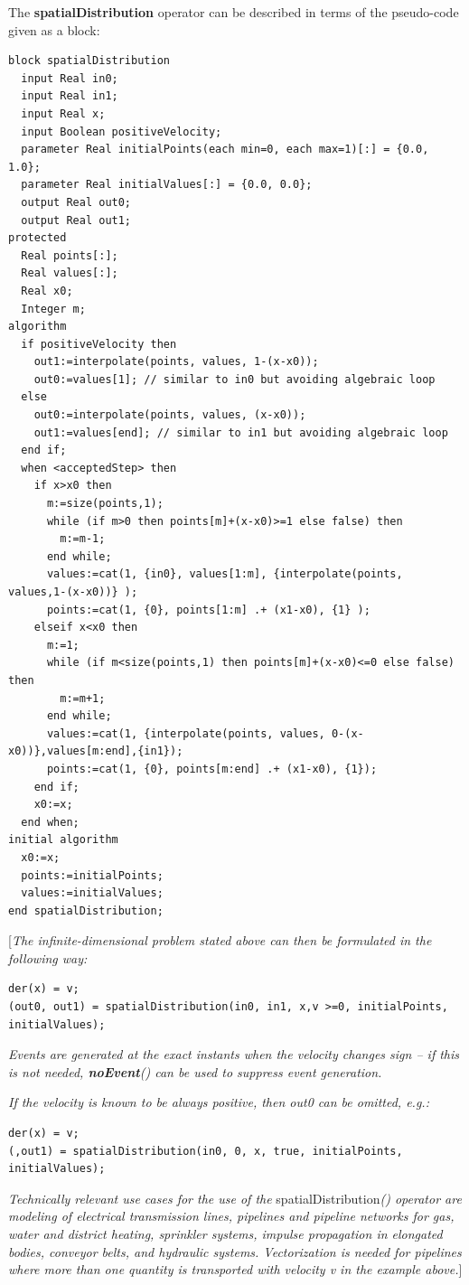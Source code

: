 \documentclass[10pt,a4paper]{report}
\begin{document}
The \textbf{spatialDistribution} operator can be described in terms of
the pseudo-code given as a block:
\begin{lstlisting}[language=modelica]
block spatialDistribution
  input Real in0;
  input Real in1;
  input Real x;
  input Boolean positiveVelocity;
  parameter Real initialPoints(each min=0, each max=1)[:] = {0.0, 1.0};
  parameter Real initialValues[:] = {0.0, 0.0};
  output Real out0;
  output Real out1;
protected
  Real points[:];
  Real values[:];
  Real x0;
  Integer m;
algorithm
  if positiveVelocity then
    out1:=interpolate(points, values, 1-(x-x0));
    out0:=values[1]; // similar to in0 but avoiding algebraic loop
  else
    out0:=interpolate(points, values, (x-x0));
    out1:=values[end]; // similar to in1 but avoiding algebraic loop
  end if;
  when <acceptedStep> then
    if x>x0 then
      m:=size(points,1);
      while (if m>0 then points[m]+(x-x0)>=1 else false) then
        m:=m-1;
      end while;
      values:=cat(1, {in0}, values[1:m], {interpolate(points, values,1-(x-x0))} );
      points:=cat(1, {0}, points[1:m] .+ (x1-x0), {1} );
    elseif x<x0 then
      m:=1;
      while (if m<size(points,1) then points[m]+(x-x0)<=0 else false) then
        m:=m+1;
      end while;
      values:=cat(1, {interpolate(points, values, 0-(x-x0))},values[m:end],{in1});
      points:=cat(1, {0}, points[m:end] .+ (x1-x0), {1});
    end if;
    x0:=x;
  end when;
initial algorithm
  x0:=x;
  points:=initialPoints;
  values:=initialValues;
end spatialDistribution;
\end{lstlisting}

{[}\emph{The infinite-dimensional problem stated above can then be
formulated in the following way:}
\begin{lstlisting}[language=modelica]
der(x) = v;
(out0, out1) = spatialDistribution(in0, in1, x,v >=0, initialPoints, initialValues);
\end{lstlisting}
\emph{Events are generated at the exact instants when the velocity
changes sign -- if this is not needed, \textbf{noEvent}() can be used to
suppress event generation.}

\emph{If the velocity is known to be always positive, then out0 can be
omitted, e.g.:}
\begin{lstlisting}[language=modelica]
der(x) = v;
(,out1) = spatialDistribution(in0, 0, x, true, initialPoints, initialValues);
\end{lstlisting}

\emph{Technically relevant use cases for the use of the}
spatialDistribution\emph{() operator are modeling of electrical
transmission lines, pipelines and pipeline networks for gas, water and
district heating, sprinkler systems, impulse propagation in elongated
bodies, conveyor belts, and hydraulic systems. Vectorization is needed
for pipelines where more than one quantity is transported with velocity
v in the example above.}{]}
\end{document}
